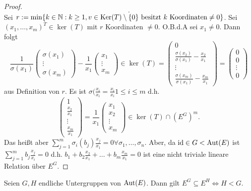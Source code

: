 \begin{proof}
\[	.\] 
	Sei $r := \min \{k \in \mathbb{N} : k \geq 1, v \in \operatorname{Ker}(T) \setminus \{0\} \text{ besitzt $k$ Koordinaten} \neq 0\} $.
	Sei $(x_1,\ldots,x_{m})^{T} \in \ker(T)$ mit $r$ Koordinaten $\neq 0$. O.B.d.A sei $x_1 \neq 0$.
	Dann folgt
	\[
		\frac{1}{\sigma(x_1)} \begin{pmatrix} 
			\sigma(x_1) \\ \vdots \\ \sigma(x_{m})
		\end{pmatrix} - \frac{1}{x_1} \begin{pmatrix} 
			x_1 \\ \vdots \\ x_{m}
		\end{pmatrix} \in \ker(T) = \begin{pmatrix} 
		0\\ \frac{\sigma(x_2)}{\sigma(x_1)} - \frac{x_2}{x_1}\\ \vdots \\ \frac{\sigma(x_{m})}{\sigma(x_1)} - \frac{x_{m}}{x_1}
		\end{pmatrix} = \begin{pmatrix} 
			0 \\ 0 \\ \vdots \\ 0
		\end{pmatrix}  
	\]
	aus Definition von $r$. Es ist $\sigma(\frac{x_{i}}{x_{i}} = \frac{x_{i}}{x_{i}} 1 \leq i \leq m$ d.h.
	\[
	\begin{pmatrix} 
		1\\ \frac{x_2}{x_1}\\ \vdots \\ \frac{x_{m}}{x_1}
	\end{pmatrix} = \frac{1}{x_1}\begin{pmatrix} 
		x_1\\ x_2\\ \vdots \\ x_{m}
	\end{pmatrix} \in \ker(T) \cap (E^{G})^{m}
	.\]
	Das heißt aber $\sum_{j=1}^{m} \sigma_{i}(b_{j}) \frac{x_{j}}{x_{1}} = 0 \forall \sigma_1,\ldots,\sigma_{n}$. Aber, da $\operatorname{id} \in G < \operatorname{Aut}(E)$ ist
	$\sum_{j=1}^{m} b_{j} \frac{x_{j}}{x_{i}} = 0$ d.h. $b_1 + b_2 \frac{x_2}{x_1} + \ldots + b_{m} \frac{x_{m}}{x_{1}} = 0$ 
	ist eine nicht triviale lineare Relation über $E^{G}$. \contra 
\end{proof}

\begin{corollary}
	Seien $G,H$ endliche Untergruppen von $\operatorname{Aut}(E)$. Dann gilt $E^{G} \subseteq E^{H} \Leftrightarrow H < G$.
\end{corollary}

